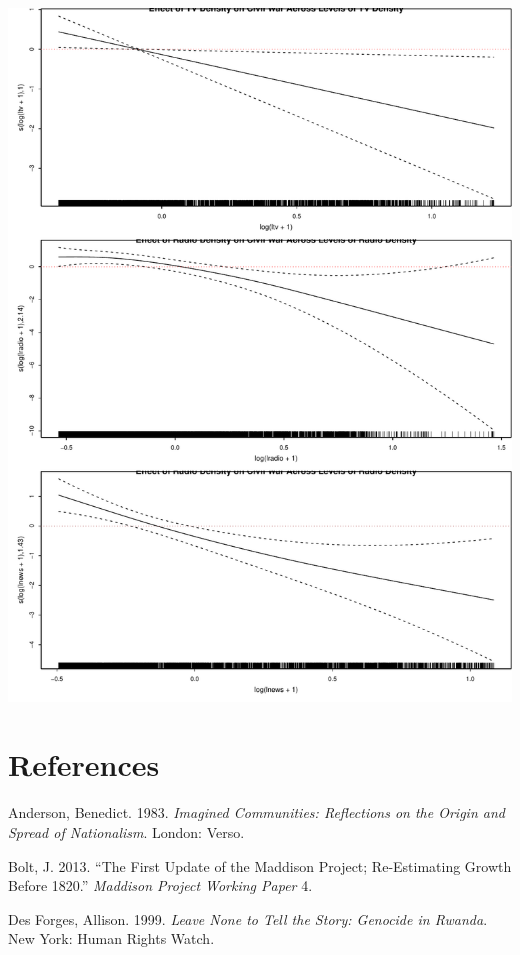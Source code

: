 \documentclass[11pt,article,oneside]{memoir}
\makeatletter
\def\maxwidth{\ifdim\Gin@nat@width>\linewidth\linewidth
\else\Gin@nat@width\fi}
\let\Oldincludegraphics\includegraphics
\renewcommand{\includegraphics}[1]{\Oldincludegraphics[width=\maxwidth]{#1}}
\makeatother
\begin{document}
\includegraphics{./media_civil_war_files/figure-markdown/disaggregated-nonlinear.pdf}
\pagebreak   

\section{References}\label{references}

\setlength{\parindent}{-0.2in} \setlength{\leftskip}{0.2in}
\setlength{\parskip}{8pt} \vspace*{-0.2in} \noindent

Anderson, Benedict. 1983. \emph{Imagined Communities: Reflections on the
Origin and Spread of Nationalism}. London: Verso.

Bolt, J. 2013. ``The First Update of the Maddison Project; Re-Estimating
Growth Before 1820.'' \emph{Maddison Project Working Paper} 4.

Des Forges, Allison. 1999. \emph{Leave None to Tell the Story: Genocide
in Rwanda}. New York: Human Rights Watch.
\end{document}
